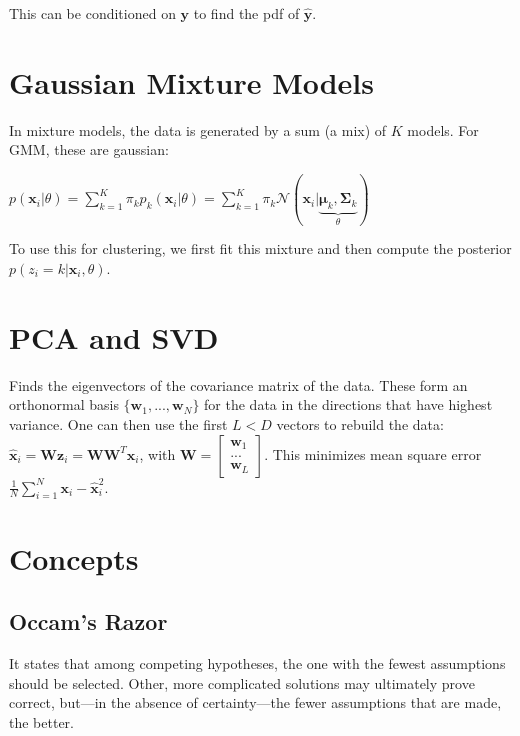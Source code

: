 \documentclass[10pt,a4paper,landscape]{article}
\providecommand{\bf}[1]{\ensuremath{\mathbf{#1}}}
\begin{document}
\begin{multicols*}{4}
This can be conditioned on $\bf{y}$ to find the pdf of $\bf{\hat{y}}$.

\section{Gaussian Mixture Models}
In mixture models, the data is generated by a sum (a mix) of $K$ models. For GMM, these are gaussian:

$p(\bf{x}_i | \theta) = \sum_{k=1}^K \pi_k p_k(\bf{x}_i | \theta) =  \sum_{k=1}^K \pi_k \mathcal{N}(\bf{x}_i | \underbrace{\bf{\mu}_k, \bf{\Sigma}_k}_{\theta})$

To use this for clustering, we first fit this mixture and then compute the posterior $p(z_i = k | \bf{x}_i, \theta)$.

\section{PCA and SVD}
Finds the eigenvectors of the covariance matrix of the data. These form an orthonormal basis $\{ \bf{w}_1, ..., \bf{w}_N\}$ for the data in the directions that have highest variance. 
One can then use the first $L < D$ vectors to rebuild the data: $\bf{\hat{x}}_i = \bf{W} \bf{z}_i = \bf{W} \bf{W}^T \bf{x}_i$, with $\bf{W} = \begin{bmatrix} \bf{w}_1 \\ ... \\ \bf{w}_L \end{bmatrix}$. 
This minimizes mean square error $\frac{1}{N} \sum_{i=1}^N \bf{x}_i - \bf{\hat{x}}_i^2$.

\section{Concepts}
\subsection{Occam's Razor}
It states that among competing hypotheses, the one with the fewest assumptions should be selected. Other, more complicated solutions may ultimately prove correct, but—in the absence of certainty—the fewer assumptions that are made, the better.


\end{multicols*}
\end{document}
